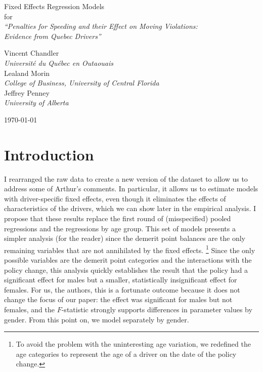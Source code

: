 \documentclass[12pt]{paper}
\begin{document}
\phantom{0}
\vspace{1.0in}


\begin{centering}

{\huge 
Fixed Effects Regression Models  \\
\bigskip
for \\
\bigskip
{\it ``Penalties for Speeding and their Effect on Moving Violations: \\
	Evidence from Quebec Drivers''} \\
}

\vspace{1.25in}


{\large 
Vincent Chandler \\
{\it Universit\'{e} du Qu\'{e}bec en Outaouais} \\
\medskip
Lealand Morin \\
{\it College of Business, University of Central Florida} \\
\medskip
Jeffrey Penney \\
{\it University of Alberta} \\
}

\vspace{1.25in}



\today

\end{centering}

\pagebreak

\section*{Introduction}

I rearranged the raw data to create a new version of the dataset to allow us to address some of Arthur's comments. 
In particular, it allows us to estimate models with driver-specific fixed effects, even though
it eliminates the effects of characteristics of the drivers, which we can show later in the empirical analysis. 
I propose that these results replace the first round of (misspecified) pooled regressions and the regressions 
by age group. 
This set of models presents a simpler analysis (for the reader) since the demerit point balances are the only remaining variables that are not annihilated by the fixed effects.%
\footnote{To avoid the problem with the uninteresting age variation, we redefined the age categories
to represent the age of a driver on the date of the policy change.} 
Since the only possible variables are the demerit point categories and the interactions with the policy change, 
this analysis quickly establishes the result that the policy had a significant effect for males but a smaller, statistically insignificant effect for females. 
For us, the authors, this is a fortunate outcome because it does not change the focus of our paper:
the effect was significant for males but not females, 
and the $F$-statistic strongly supports differences in parameter values by gender. 
From this point on, we model separately by gender. 
\end{document}
